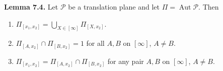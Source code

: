 \textbf{Lemma 7.4.} Let $\mathcal{P}$ be a translation plane and let $\Pi = \operatorname{Aut} \mathcal{P}$. Then
\begin{enumerate}
\item[(i)] $\Pi_{[x_1, x_2]} = \bigcup_{X \in [\infty]} \Pi_{[X, x_2]}$.
\item[(ii)] $\Pi_{[A, x_2]} \cap \Pi_{[B, x_2]} = 1$ for all $A, B$ on $[\infty]$, $A \neq B$.
\item[(iii)] $\Pi_{[x_1, x_2]} = \Pi_{[A, x_2]} \cap \Pi_{[B, x_2]}$ for any pair $A, B$ on $[\infty]$, $A \neq B$.
\end{enumerate}
